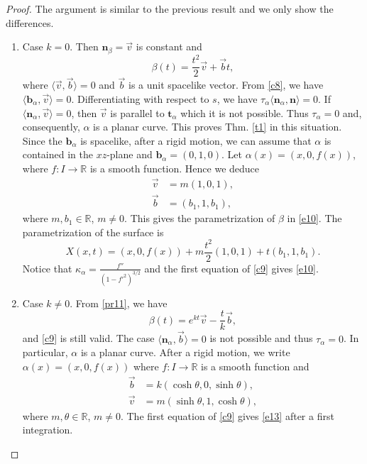 \documentclass[a4paper,12pt]{amsart}
\numberwithin{equation}{section}
\theoremstyle{definition}
\def\r{\mathbb R}
\def\r{\mathbb R}
\def\t{\mathbf t}
\def\n{\mathbf n}
\def\b{\mathbf b}
\begin{document}
\begin{proof}
The argument is similar to the previous result and we only show the differences.
\begin{enumerate}
\item Case $k=0$. Then $\n_\beta=\vec{v}$ is constant and 
$$\beta(t)=\frac{t^2}{2}\vec{v}+\vec{b}t,$$
where $\langle \vec{v},\vec{b}\rangle=0$ and $\vec{b}$ is a unit spacelike vector. From \eqref{c8}, we have  $\langle\b_\alpha,\vec{v}\rangle=0$.  Differentiating with respect to $s$, we have $\tau_\alpha\langle\n_\alpha,\n\rangle=0$. If $\langle\n_\alpha,\vec{v}\rangle=0$, then $\vec{v}$ is parallel to $\t_\alpha$ which it is not possible. Thus $\tau_\alpha=0$ and, consequently, $\alpha$ is a planar curve. This proves Thm. \ref{t1} in this situation. Since the $\b_\alpha$ is spacelike,  after a rigid motion, we can assume that $\alpha$ is contained in the $xz$-plane and $\b_\alpha=(0,1,0)$. Let $\alpha(x)=(x,0,f(x))$, where $f\colon I\to\r$ is a smooth function. Hence we deduce 
\begin{equation*}
\begin{split}
\vec{v}&=m(1,0,1),\\
 \vec{b}&=(b_1,1,b_1),
 \end{split}
 \end{equation*}
where $m,b_1\in\r$, $m\not=0$. This gives the parametrization of $\beta$ in \eqref{e10}. 
The parametrization of the surface is
$$X(x,t)=(x,0,f(x))+m\frac{t^2}{2}(1,0,1)+t(b_1,1,b_1).$$
Notice that $\kappa_\alpha=\frac{f''}{(1-f'^2)^{3/2}}$ and the first equation of \eqref{c9} gives \eqref{e10}.  
\item Case $k\not=0$. From \eqref{pr11}, we have  
$$\beta(t)=e^{kt}\vec{v}-\frac{t}{k}\vec{b},$$
and \eqref{c9} is still valid. The case  $\langle\n_\alpha,\vec{b} \rangle=0$ is not possible and thus $\tau_\alpha=0$.   In particular, $\alpha$ is a planar curve. After a rigid motion, we write   $\alpha(x)=(x,0,f(x))$ where $f\colon I\to\r$ is a smooth function  and 
\begin{equation*}
\begin{split}
\vec{b}&=k(\cosh\theta,0,\sinh\theta),\\
\vec{v}&=m(\sinh\theta,1,\cosh\theta),
\end{split}
\end{equation*}
where $m,\theta\in\r$, $m\not=0$. The first equation of \eqref{c9} gives \eqref{e13} after a first integration. 
 

\end{enumerate}

 \end{proof}
\end{document}
